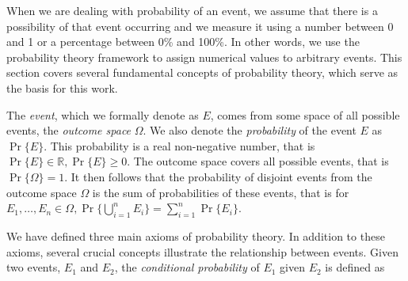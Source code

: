 
\renewcommand{\Pr}[1]{\operatorname{Pr}\{#1\}}

When we are dealing with probability of an event, we assume that there is a possibility
of that event occurring and we measure it using a number between 0 and 1 or a percentage
between 0\% and 100\%. In other words, we use the probability theory framework to assign
numerical values to arbitrary events. This section covers several fundamental concepts of
probability theory, which serve as the basis for this work.

The \textit{event}, which we formally denote as $E$, comes from some space of all possible
events, the \textit{outcome space} $\Omega$. We also denote the \textit{probability} of the
event $E$ as $\Pr{E}$. This probability is a real non-negative number,
that is $\Pr{E} \in \mathbb{R}, \Pr{E} \geq 0$. The outcome
space covers all possible events, that is $\Pr{\Omega} = 1$. It then follows
that the probability of disjoint events from the outcome space $\Omega$ is the sum of
probabilities of these events, that is for
$E_1, \ldots, E_n \in \Omega, \Pr{\bigcup_{i=1}^n E_i} = \sum_{i=1}^n \Pr{E_i}$.

We have defined three main axioms of probability theory. In addition to these axioms, several crucial concepts illustrate the relationship between events. Given two events, $E_1$ and $E_2$, the \textit{conditional probability} of $E_1$ given $E_2$ is defined as

